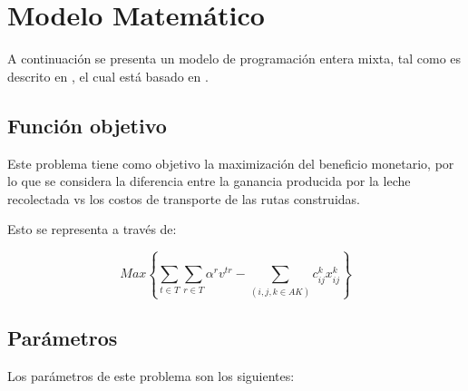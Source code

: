 \section{Modelo Matemático}

A continuación se presenta un modelo de programación entera mixta, tal como es descrito en \cite{Lechemezclada2}, el cual está basado en \cite{MilkWithBlending}.

\subsection{Función objetivo}

Este problema tiene como objetivo la maximización del beneficio monetario, por lo que se considera la diferencia entre la ganancia producida por la leche recolectada vs los costos de transporte de las rutas construidas.

Esto se representa a través de:

\begin{equation}
    Max \left\{ \sum_{t\in T}\sum_{r\in T} \alpha^{r}v^{tr} - \sum_{(i, j, k \in A K)} c_{i j}^{k}x_{i j}^{k} \right\}
\end{equation}


\subsection{Parámetros}

Los parámetros de este problema son los siguientes:

